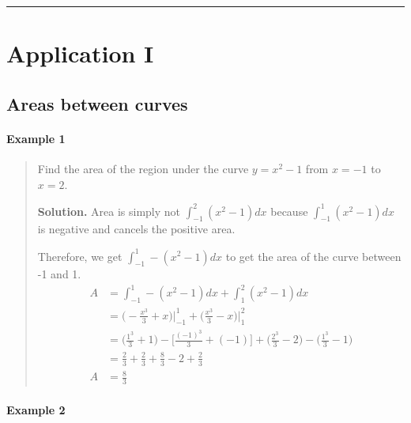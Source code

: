 \documentclass[
]{article}
\begin{document}
\begin{center}\rule{0.5\linewidth}{0.5pt}\end{center}

\hypertarget{application-i}{%
\section{Application I}\label{application-i}}

\hypertarget{areas-between-curves}{%
\subsection{Areas between curves}\label{areas-between-curves}}

\hypertarget{example-1-1}{%
\paragraph*{Example 1}\label{example-1-1}}

\begin{quote}
Find the area of the region under the curve \(y=x^2-1\) from \(x=-1\) to
\(x=2\).

\textbf{Solution.} Area is simply not \(\int_{-1}^2 (x^2-1)dx\) because
\(\int_{-1}^1 (x^2-1)dx\) is negative and cancels the positive area.

Therefore, we get \(\int_{-1}^1 -(x^2-1)dx\) to get the area of the
curve between -1 and 1. \begin{align*}
A &= \int_{-1}^1-(x^2-1)dx+\int_1^2(x^2-1)dx \\
&= \Big(-\frac{x^3}{3}+x\Big)\Bigg|_{-1}^1+\Big(\frac{x^3}{3}-x\Big)\Bigg|_1^2\\
&= \Big(\frac{1^3}{3}+1\Big)-\Big[\frac{(-1)^3}{3}+(-1)\Big]+\Big(\frac{2^3}{3}-2\Big)-\Big(\frac{1^3}{3}-1\Big)\\
&= \frac{2}{3}+\frac{2}{3}+\frac{8}{3}-2+\frac{2}{3}\\
A &= \frac{8}{3} 
\end{align*}
\end{quote}

\hypertarget{example-2-1}{%
\paragraph*{Example 2}\label{example-2-1}}
\end{document}
